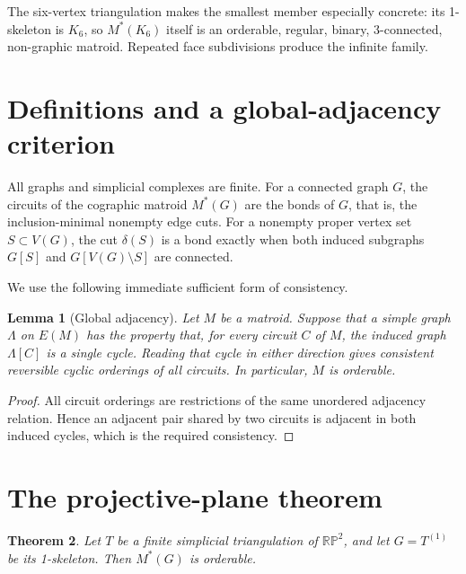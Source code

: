 \documentclass[11pt]{article}
\newtheorem{theorem}{Theorem}[section]
\newtheorem{lemma}[theorem]{Lemma}
\newcommand{\RP}{\mathbb{RP}}
\begin{document}
The six-vertex triangulation makes the smallest member especially concrete:
its 1-skeleton is $K_6$, so $M^*(K_6)$ itself is an orderable, regular, binary,
3-connected, non-graphic matroid. Repeated face subdivisions produce the
infinite family.

\section{Definitions and a global-adjacency criterion}

All graphs and simplicial complexes are finite. For a connected graph $G$, the
circuits of the cographic matroid $M^*(G)$ are the bonds of $G$, that is, the
inclusion-minimal nonempty edge cuts. For a nonempty proper vertex set
$S\subset V(G)$, the cut $\delta(S)$ is a bond exactly when both induced
subgraphs $G[S]$ and $G[V(G)\setminus S]$ are connected.

We use the following immediate sufficient form of consistency.

\begin{lemma}[Global adjacency]\label{lem:global}
Let $M$ be a matroid. Suppose that a simple graph $\Lambda$ on $E(M)$ has the
property that, for every circuit $C$ of $M$, the induced graph $\Lambda[C]$ is
a single cycle. Reading that cycle in either direction gives consistent
reversible cyclic orderings of all circuits. In particular, $M$ is orderable.
\end{lemma}

\begin{proof}
All circuit orderings are restrictions of the same unordered adjacency
relation. Hence an adjacent pair shared by two circuits is adjacent in both
induced cycles, which is the required consistency.
\end{proof}

\section{The projective-plane theorem}

\begin{theorem}\label{thm:rp2}
Let $T$ be a finite simplicial triangulation of $\RP^2$, and let
$G=T^{(1)}$ be its 1-skeleton. Then $M^*(G)$ is orderable.
\end{theorem}
\end{document}
